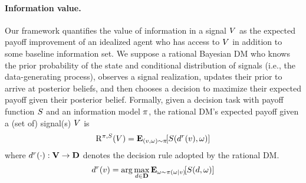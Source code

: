 \mvspace{-4mm}
\paragraph{Information value.}
Our framework quantifies the value of information in a signal $V$ as the expected payoff improvement of an idealized agent who has access to $V$ in addition to some baseline information set.
We suppose a rational Bayesian DM who knows the prior probability of the state and conditional distribution of signals (i.e., the data-generating process), observes a signal realization, updates their prior to arrive at posterior beliefs, and then chooses a decision to maximize their expected payoff given their posterior belief. 
Formally, given a decision task with payoff function $S$ and an information model $\pi$, the rational DM's expected payoff given a (set of) signal(s) $V$ is
\mvspace{-1mm}
\begin{equation}
\mathrm{R}^{\dgp, \score}
(\sig)
= \expect[(\sigval, \payoffstatevalue) \sim \dgp]{\score(\action^r(\sigval), \payoffstatevalue)}
\end{equation}
\mvspace{-4mm}
\noindent where $d^r(\cdot): \mathbf{V} \rightarrow \mathbf{D}$ denotes the decision rule adopted by the rational DM.
\begin{equation}
\label{eq:rationalDM}
    \action^r(\sigval) = \arg \max_{\action\in\actionspace} \expect[\payoffstatevalue \sim \dgp(\payoffstatevalue|\sigval)]{\score(\action, \payoffstatevalue)}
\end{equation}

